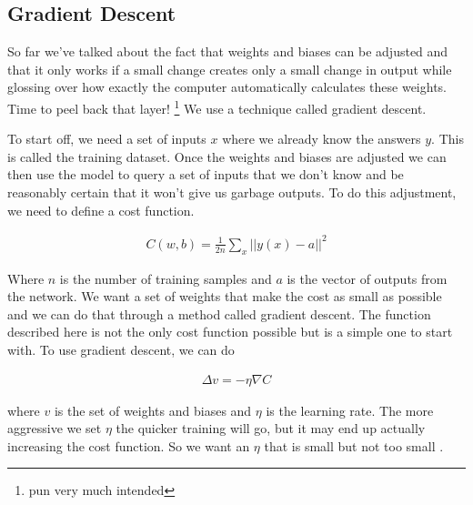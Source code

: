 \subsection{Gradient Descent}

So far we've talked about the fact that weights and biases can be adjusted and that it only works if a small change creates only a small change in output while glossing over how exactly the computer automatically calculates these weights.
Time to peel back that layer!
\footnote{pun very much intended}
We use a technique called gradient descent.

To start off, we need a set of inputs $x$ where we already know the answers $y$.
This is called the training dataset.
Once the weights and biases are adjusted we can then use the model to query a set of inputs that we don't know and be reasonably certain that it won't give us garbage outputs.
To do this adjustment, we need to define a cost function.

\begin{align}
  C(w,b) = \frac{1}{2n} \sum_x || y(x) - a||^2
\end{align}

Where $n$ is the number of training samples and $a$ is the vector of outputs from the network.
We want a set of weights that make the cost as small as possible and we can do that through a method called gradient descent.
The function described here is not the only cost function possible but is a simple one to start with.
To use gradient descent, we can do

\begin{align}
  \Delta v = - \eta \nabla C
\end{align}

where $v$ is the set of weights and biases and $\eta$ is the learning rate.
The more aggressive we set $\eta$ the quicker training will go, but it may end up actually increasing the cost function.
So we want an $\eta$ that is small but not too small \cite{Goodfellow_2016}.
